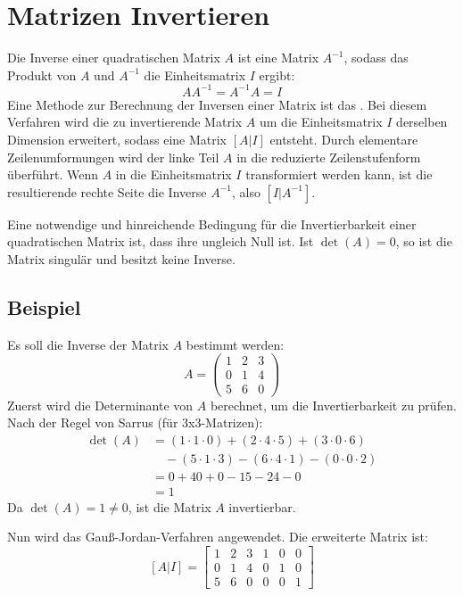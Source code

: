 \chapter{Matrizen Invertieren}

Die Inverse einer quadratischen Matrix \(A\) ist eine Matrix \(A^{-1}\), sodass
das Produkt von \(A\) und \(A^{-1}\) die Einheitsmatrix \(I\) ergibt:
\[ AA^{-1} = A^{-1}A = I \]
Eine Methode zur Berechnung der Inversen einer Matrix ist das
. Bei diesem Verfahren wird die zu
invertierende Matrix \(A\) um die Einheitsmatrix \(I\) derselben Dimension
erweitert, sodass eine Matrix \([A|I]\) entsteht. Durch elementare
Zeilenumformungen wird der linke Teil \(A\) in die reduzierte Zeilenstufenform
überführt. Wenn \(A\) in die Einheitsmatrix \(I\) transformiert werden kann,
ist die resultierende rechte Seite die Inverse \(A^{-1}\), also \([I|A^{-1}]\).

Eine notwendige und hinreichende Bedingung für die Invertierbarkeit einer
quadratischen Matrix ist, dass ihre  ungleich Null ist.
Ist \(\det(A) = 0\), so ist die Matrix singulär und besitzt keine Inverse.

\section{Beispiel}

Es soll die Inverse der Matrix \(A\) bestimmt werden:
\[ A = \begin{pmatrix}
        1 & 2 & 3 \\
        0 & 1 & 4 \\
        5 & 6 & 0
    \end{pmatrix} \]
Zuerst wird die Determinante von \(A\) berechnet, um die Invertierbarkeit zu
prüfen. Nach der Regel von Sarrus (für 3x3-Matrizen):
\begin{align*}
    \det(A) & = (1 \cdot 1 \cdot 0) + (2 \cdot 4 \cdot 5) + (3 \cdot 0 \cdot 6)       \\
            & \quad - (5 \cdot 1 \cdot 3) - (6 \cdot 4 \cdot 1) - (0 \cdot 0 \cdot 2) \\
            & = 0 + 40 + 0 - 15 - 24 - 0                                              \\
            & = 1
\end{align*}
Da \(\det(A) = 1 \neq 0\), ist die Matrix \(A\) invertierbar.

Nun wird das Gauß-Jordan-Verfahren angewendet. Die erweiterte Matrix ist:
\[ \left[ A | I \right] = \left[ \begin{array}{ccc|ccc}
            1 & 2 & 3 & 1 & 0 & 0 \\
            0 & 1 & 4 & 0 & 1 & 0 \\
            5 & 6 & 0 & 0 & 0 & 1
        \end{array} \right] \]

